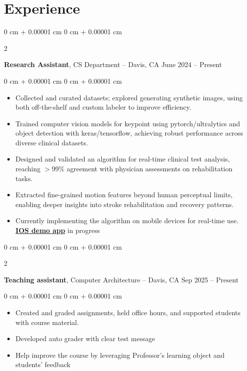 \documentclass[10pt, letterpaper]{article}
\newenvironment{highlights}{
    \begin{itemize}[
        topsep=0.10 cm,
        parsep=0.10 cm,
        partopsep=0pt,
        itemsep=0pt,
        leftmargin=0 cm + 10pt
    ]
}{
    \end{itemize}
} %
\newenvironment{onecolentry}{
    \begin{adjustwidth}{
        0 cm + 0.00001 cm
    }{
        0 cm + 0.00001 cm
    }
}{
    \end{adjustwidth}
} %
\newenvironment{twocolentry}[2][]{
    \onecolentry
    \def\secondColumn{#2}
    \setcolumnwidth{\fill, 6 cm}
    \begin{paracol}{2}
}{
    \switchcolumn \raggedleft \secondColumn
    \end{paracol}
    \endonecolentry
} %
\begin{document}
    
    \section{Experience}



        
        \begin{twocolentry}{
            June 2024 – Present
        }
            \textbf{Research Assistant}, CS Department -- Davis, CA\end{twocolentry}

        \vspace{0.10 cm}
        \begin{onecolentry}
            \begin{highlights}
                \item Collected and curated datasets; explored generating synthetic images, using both off-the-shelf and custom labeler to improve efficiency.
                \item Trained computer vision models for keypoint using pytorch/ultralytics and object detection with keras/tensorflow, achieving robust performance across diverse clinical datasets.
                \item Designed and validated an algorithm for real-time clinical test analysis, reaching $>$99\% agreement with physician assessments on rehabilitation tasks.
                \item Extracted fine-grained motion features beyond human perceptual limits, enabling deeper insights into stroke rehabilitation and recovery patterns. 
               \item Currently implementing the algorithm on mobile devices for real-time use.  \href{https://github.com/AlundorZhu/CMORE-app}{\textbf{IOS demo app}} in progress
            \end{highlights}
        \end{onecolentry}

        \vspace{0.2 cm}

        \begin{twocolentry}{
            Sep 2025 – Present
        }
            \textbf{Teaching assistant}, Computer Architecture -- Davis, CA\end{twocolentry}

        \vspace{0.10 cm}
        \begin{onecolentry}
            \begin{highlights}
                \item Created and graded assignments, held office hours, and supported students with course material.
                \item Developed auto grader with clear test message
                \item Help improve the course by leveraging Professor's learning object and students' feedback

            \end{highlights}
        \end{onecolentry}
\end{document}
